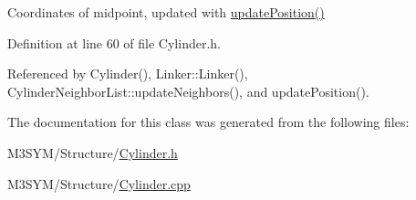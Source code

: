 Coordinates of midpoint, updated with \hyperlink{classCylinder_aff701d6f4400ab216431d627c54a0b4e}{update\+Position()} 



Definition at line 60 of file Cylinder.\+h.



Referenced by Cylinder(), Linker\+::\+Linker(), Cylinder\+Neighbor\+List\+::update\+Neighbors(), and update\+Position().



The documentation for this class was generated from the following files\+:\begin{DoxyCompactItemize}
\item 
M3\+S\+Y\+M/\+Structure/\hyperlink{Cylinder_8h}{Cylinder.\+h}\item 
M3\+S\+Y\+M/\+Structure/\hyperlink{Cylinder_8cpp}{Cylinder.\+cpp}\end{DoxyCompactItemize}

